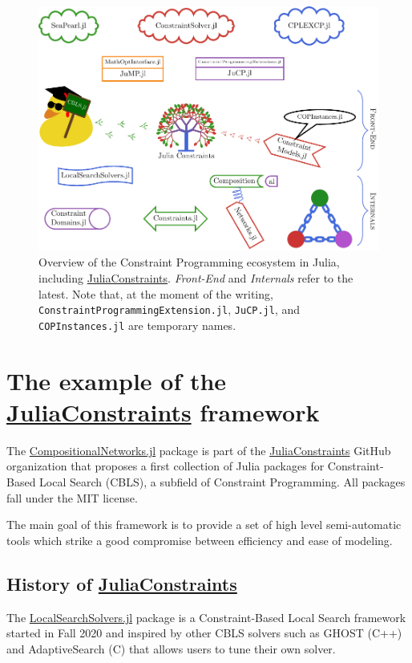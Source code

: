 \documentclass{juliacon}
\newcommand{\jc}{\href{https://github.com/JuliaConstraints}{JuliaConstraints}\xspace}
\newcommand{\cnjl}{\href{https://github.com/JuliaConstraints/CompositionalNetworks.jl}{CompositionalNetworks.jl}\xspace}
\newcommand{\lssjl}{\href{https://github.com/JuliaConstraints/LocalSearchSolvers.jl}{LocalSearchSolvers.jl}\xspace}
\begin{document}
\begin{figure}[t]
  \centerline{\includegraphics[page=1, width=.9\textwidth]{figs/overview.pdf}}
  \caption{Overview of the Constraint Programming ecosystem in Julia, including \jc. \emph{Front-End} and \emph{Internals} refer to the latest. Note that, at the moment of the writing, \texttt{ConstraintProgrammingExtension.jl}, \texttt{JuCP.jl}, and \texttt{COPInstances.jl} are temporary names.}
  \label{fig:overview}
\end{figure}


\section{The example of the \jc framework}
\label{sec:juliaconstraints}

The \cnjl package is part of the \jc GitHub organization that proposes a first collection of Julia packages for Constraint-Based Local Search (CBLS), a subfield of Constraint Programming. All packages fall under the MIT license.

The main goal of this framework is to provide a set of high level semi-automatic tools which strike a good compromise between efficiency and ease of modeling.

\subsection{History of \jc}
\label{subsec:history}

The \lssjl package is a Constraint-Based Local Search framework started in Fall 2020 and inspired by other CBLS solvers such as GHOST (C++) and AdaptiveSearch (C) that allows users to tune their own solver.
\end{document}
